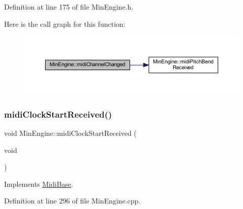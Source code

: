 Definition at line 175 of file Min\+Engine.\+h.

Here is the call graph for this function\+:
\nopagebreak
\begin{figure}[H]
\begin{center}
\leavevmode
\includegraphics[width=350pt]{d4/d0f/class_min_engine_a5a88234cb86802788fd959d58efc9563_cgraph}
\end{center}
\end{figure}
\mbox{\label{class_min_engine_ad0378027f052b780481611fa4335b68d}} 
\subsubsection{\texorpdfstring{midi\+Clock\+Start\+Received()}{midiClockStartReceived()}}
{\footnotesize\ttfamily void Min\+Engine\+::midi\+Clock\+Start\+Received (\begin{DoxyParamCaption}\item[{void}]{ }\end{DoxyParamCaption})\hspace{0.3cm}{\ttfamily [virtual]}}



Implements \hyperlink{class_midi_base_aa368fed406eb62f900beb801e0552709}{Midi\+Base}.



Definition at line 296 of file Min\+Engine.\+cpp.


